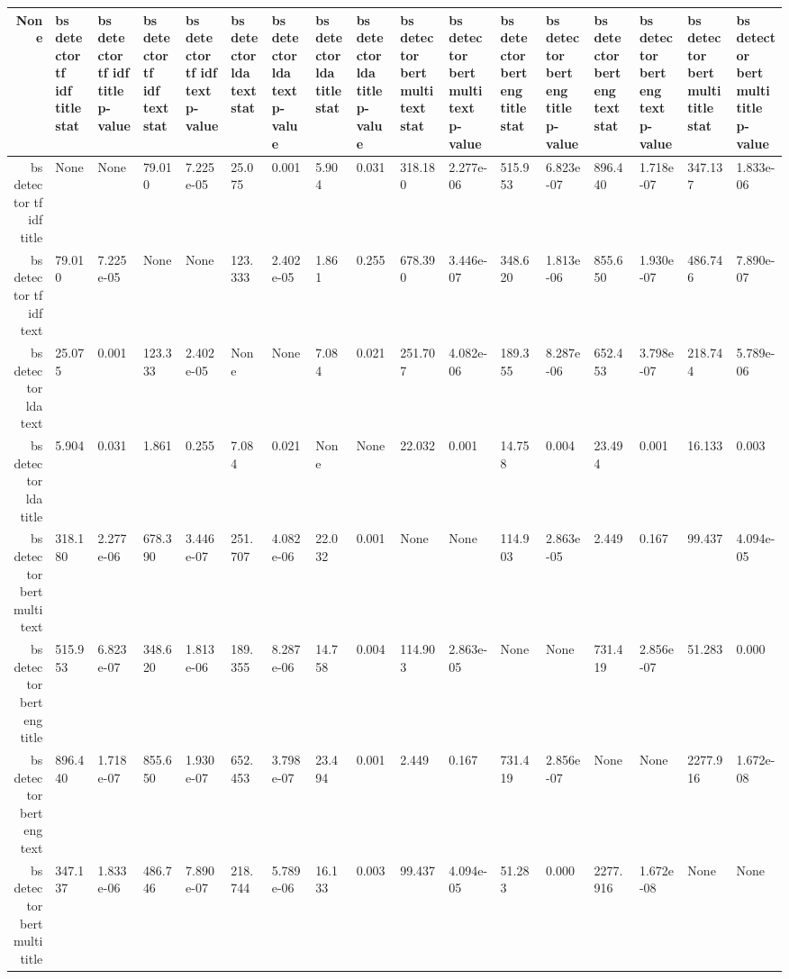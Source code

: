 \begin{tabular}{|r|l|l|l|l|l|l|l|l|l|l|l|l|l|l|l|l|}
  \hline
  None & bs detector tf idf title stat & bs detector tf idf title p-value & bs detector tf idf text stat & bs detector tf idf text p-value & bs detector lda text stat & bs detector lda text p-value & bs detector lda title stat & bs detector lda title p-value & bs detector bert multi text stat & bs detector bert multi text p-value & bs detector bert eng title stat & bs detector bert eng title p-value & bs detector bert eng text stat & bs detector bert eng text p-value & bs detector bert multi title stat & bs detector bert multi title p-value \\ 
  \hline
  bs detector tf idf title & None & None & 79.010 & 7.225e-05 & 25.075 & 0.001 & 5.904 & 0.031 & 318.180 & 2.277e-06 & 515.953 & 6.823e-07 & 896.440 & 1.718e-07 & 347.137 & 1.833e-06 \\ 
  \hline
  bs detector tf idf text & 79.010 & 7.225e-05 & None & None & 123.333 & 2.402e-05 & 1.861 & 0.255 & 678.390 & 3.446e-07 & 348.620 & 1.813e-06 & 855.650 & 1.930e-07 & 486.746 & 7.890e-07 \\ 
  \hline
  bs detector lda text & 25.075 & 0.001 & 123.333 & 2.402e-05 & None & None & 7.084 & 0.021 & 251.707 & 4.082e-06 & 189.355 & 8.287e-06 & 652.453 & 3.798e-07 & 218.744 & 5.789e-06 \\ 
  \hline
  bs detector lda title & 5.904 & 0.031 & 1.861 & 0.255 & 7.084 & 0.021 & None & None & 22.032 & 0.001 & 14.758 & 0.004 & 23.494 & 0.001 & 16.133 & 0.003 \\ 
  \hline
  bs detector bert multi text & 318.180 & 2.277e-06 & 678.390 & 3.446e-07 & 251.707 & 4.082e-06 & 22.032 & 0.001 & None & None & 114.903 & 2.863e-05 & 2.449 & 0.167 & 99.437 & 4.094e-05 \\ 
  \hline
  bs detector bert eng title & 515.953 & 6.823e-07 & 348.620 & 1.813e-06 & 189.355 & 8.287e-06 & 14.758 & 0.004 & 114.903 & 2.863e-05 & None & None & 731.419 & 2.856e-07 & 51.283 & 0.000 \\ 
  \hline
  bs detector bert eng text & 896.440 & 1.718e-07 & 855.650 & 1.930e-07 & 652.453 & 3.798e-07 & 23.494 & 0.001 & 2.449 & 0.167 & 731.419 & 2.856e-07 & None & None & 2277.916 & 1.672e-08 \\ 
  \hline
  bs detector bert multi title & 347.137 & 1.833e-06 & 486.746 & 7.890e-07 & 218.744 & 5.789e-06 & 16.133 & 0.003 & 99.437 & 4.094e-05 & 51.283 & 0.000 & 2277.916 & 1.672e-08 & None & None \\ 
  \hline
\end{tabular}
